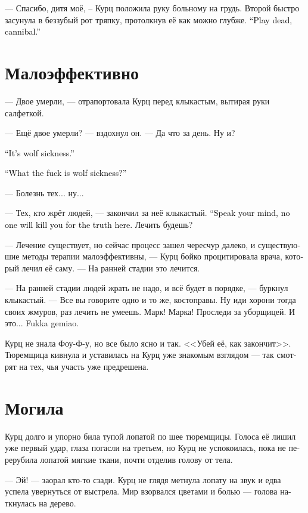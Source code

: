 \documentclass[a4paper,12pt,fleqn]{book}\usepackage{cooltooltips}\usepackage{polyglossia}\setdefaultlanguage[babelshorthands=true]{russian}\setotherlanguage{english}\defaultfontfeatures{Ligatures=TeX,Mapping=tex-text} \usepackage{xcolor}\definecolor{lightgray}{HTML}{bbbbbb}\color{lightgray}\newcommand{\ml}[3]{\textenglish{\textcolor{black}{#3}}}
\begin{document}
--- Спасибо, дитя моё, -- Курц положила руку больному на грудь.
Второй быстро засунула в беззубый рот тряпку, протолкнув её как можно глубже.
\ml{$0$}
{--- Сыграй с дьяволом, людоед.}
{``Play dead, cannibal.''}

\section{Малоэффективно}

--- Двое умерли, --- отрапортовала Курц перед клыкастым, вытирая руки салфеткой.

--- Ещё двое умерли? --- вздохнул он. --- Да что за день.
Ну и?

\ml{$0$}
{--- Это волчья болезнь.}
{``It's wolf sickness.''}

\ml{$0$}
{--- Что ещё за волчья болезнь?}
{``What the fuck is wolf sickness?''}

--- Болезнь тех... ну...

--- Тех, кто жрёт людей, --- закончил за неё клыкастый.
\ml{$0$}
{--- Говори прямо, за правду здесь тебя никто не убьёт.}
{``Speak your mind, no one will kill you for the truth here.}
Лечить будешь?

--- Лечение существует, но сейчас процесс зашел чересчур далеко, и существуюшие методы терапии малоэффективны, --- Курц бойко процитировала врача, который лечил её саму.
--- На ранней стадии это лечится.

--- На ранней стадии людей жрать не надо, и всё будет в порядке, --- буркнул клыкастый.
--- Все вы говорите одно и то же, костоправы.
Ну иди хорони тогда своих жмуров, раз лечить не умеешь.
Марк!
Марка!
Проследи за уборщицей.
И это... Fukka gemiao.

Курц не знала Фоу-Ф-у, но все было ясно и так.
<<Убей её, как закончит>>.
Тюремщица кивнула и уставилась на Курц уже знакомым взглядом --- так смотрят на тех, чья участь уже предрешена.

\section{Могила}

Курц долго и упорно била тупой лопатой по шее тюремщицы.
Голоса её лишил уже первый удар, глаза погасли на третьем, но Курц не успокоилась, пока не перерубила лопатой мягкие ткани, почти отделив голову от тела.

--- Эй! --- заорал кто-то сзади.
Курц не глядя метнула лопату на звук и едва успела увернуться от выстрела.
Мир взорвался цветами и болью --- голова наткнулась на дерево.
\end{document}
